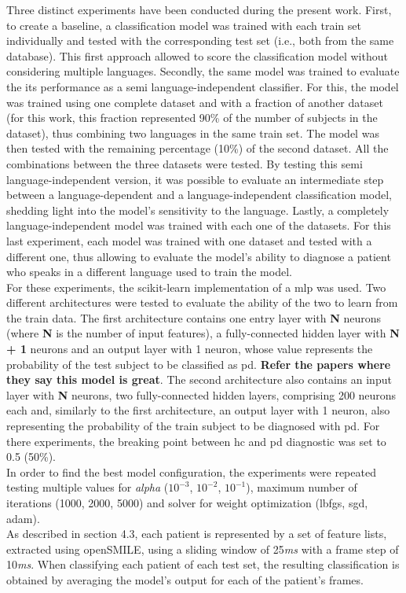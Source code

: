 Three distinct experiments have been conducted during the present work. First, to create a baseline, a classification model was trained with each train set individually and tested with the corresponding test set (i.e., both from the same database). This first approach allowed to score the classification model without considering multiple languages. Secondly, the same model was trained to evaluate the its performance as a semi language-independent classifier. For this, the model was trained using one complete dataset and with a fraction of another dataset (for this work, this fraction represented 90\% of the number of subjects in the dataset), thus combining two languages in the same train set. The model was then tested with the remaining percentage (10\%) of the second dataset. All the combinations between the three datasets were tested. By testing this semi language-independent version, it was possible to evaluate an intermediate step between a language-dependent and a language-independent classification model, shedding light into the model's sensitivity to the language. Lastly, a completely language-independent model was trained with each one of the datasets. For this last experiment, each model was trained with one dataset and tested with a different one, thus allowing to evaluate the model's ability to diagnose a patient who speaks in a different language used to train the model.
\\
For these experiments, the scikit-learn \cite{scikit-learn} implementation of a \gls{mlp} was used. Two different architectures were tested to evaluate the ability of the two to learn from the train data. The first architecture contains one entry layer with \textbf{N} neurons (where \textbf{N} is the number of input features), a fully-connected hidden layer with \textbf{N + 1} neurons and an output layer with 1 neuron, whose value represents the probability of the test subject to be classified as \gls{pd}. \textbf{Refer the papers where they say this model is great}. The second architecture also contains an input layer with \textbf{N} neurons, two fully-connected hidden layers, comprising 200 neurons each and, similarly to the first architecture, an output layer with 1 neuron, also representing the probability of the train subject to be diagnosed with \gls{pd}. For there experiments, the breaking point between \gls{hc} and \gls{pd} diagnostic was set to 0.5 (50\%).
\\
In order to find the best model configuration, the experiments were repeated testing multiple values for \textit{alpha} ($ 10^{-3} $, $ 10 ^{-2} $, $ 10 ^{-1} $), maximum number of iterations (1000, 2000, 5000) and solver for weight optimization (lbfgs, sgd, adam). 
\\
As described in section 4.3, each patient is represented by a set of feature lists, extracted using openSMILE, using a sliding window of 25\textit{ms} with a frame step of 10\textit{ms}. When classifying each patient of each test set, the resulting classification is obtained by averaging the model's output for each of the patient's frames.

